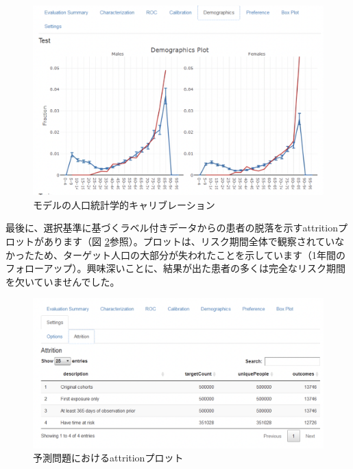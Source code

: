 \documentclass[
  11pt]{book}
\theoremstyle{definition}
\theoremstyle{definition}
\theoremstyle{definition}
\theoremstyle{definition}
\theoremstyle{remark}
\begin{document}
\begin{figure}

{\centering \includegraphics[width=1\linewidth]{images/PatientLevelPrediction/shiny/singleShiny/singleShinyDemo} 

}

\caption{モデルの人口統計学的キャリブレーション}\label{fig:shinyDemo}
\end{figure}

最後に、選択基準に基づくラベル付きデータからの患者の脱落を示すattritionプロットがあります（図 \ref{fig:shinyAtt}参照）。プロットは、リスク期間全体で観察されていなかったため、ターゲット人口の大部分が失われたことを示しています（1年間のフォローアップ）。興味深いことに、結果が出た患者の多くは完全なリスク期間を欠いていませんでした。

\begin{figure}

{\centering \includegraphics[width=1\linewidth]{images/PatientLevelPrediction/shiny/singleShiny/singleShinyAtt} 

}

\caption{予測問題におけるattritionプロット}\label{fig:shinyAtt}
\end{figure}
\end{document}

